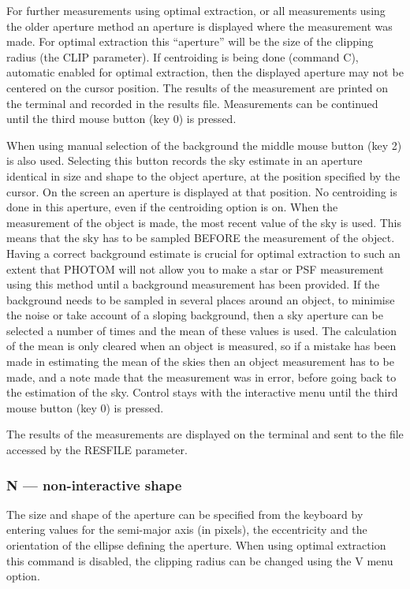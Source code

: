 \documentclass[twoside,11pt,nolof]{starlink}
\begin{document}
For further measurements using optimal extraction, or all measurements
using the older aperture method an aperture is displayed where the measurement was made. For optimal extraction this ``aperture'' will be the size of
the clipping radius (the CLIP parameter). If centroiding is being done
(command C), automatic enabled for optimal extraction, then the displayed aperture may not be centered on the cursor position. The results of the measurement are printed on the terminal and recorded in the results file. Measurements can be continued until the third mouse button (key 0) is pressed.

When using manual selection of the background the middle mouse button
(key 2) is also used. Selecting this button records the sky estimate
in an aperture identical in size and shape to the object aperture, at
the position specified by the cursor. On the screen an aperture is
displayed at that position. No centroiding is done in this aperture,
even if the centroiding option is on. When the measurement of the
object is made, the most recent value of the sky is used. This means
that the sky has to be sampled BEFORE the measurement of the
object. Having a correct background estimate is crucial for optimal
extraction to such an extent that PHOTOM will not allow you to make a
star or PSF measurement using this method until a background measurement
has been provided. If the background needs to be sampled in several places around an object, to minimise the noise or take account of a sloping
background, then a sky aperture can be selected a number of times
and the mean of these values is used. The calculation of the
mean is only cleared when an object is measured, so if a mistake
has been made in estimating the mean of the skies then an object
measurement has to be made, and a note made that the measurement
was in error, before going back to the estimation of the sky. Control
stays with the interactive menu until the third mouse button (key 0)
is pressed.

The results of the measurements are displayed on the terminal and sent
to the file accessed by the RESFILE parameter.

\subsubsection{N --- non-interactive shape}

The size and shape of the aperture can be specified from the keyboard
by entering values for the semi-major axis (in pixels), the
eccentricity and the orientation of the ellipse defining the aperture.
When using optimal extraction this command is disabled, the clipping radius
can be changed using the V menu option.
\end{document}
